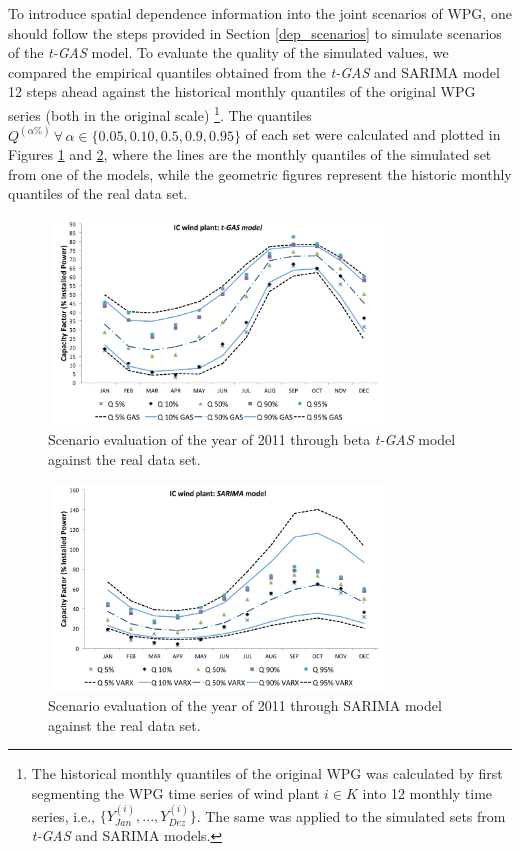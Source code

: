 \documentclass[a4paper]{IEEEtran}
\begin{document}
To introduce spatial dependence information into the joint scenarios of WPG, one should follow the steps provided in Section \ref{dep_scenarios} to simulate scenarios of the \emph{t-GAS} model. To evaluate the quality of the simulated values, we compared the empirical quantiles obtained from the \emph{t-GAS} and SARIMA model 12 steps ahead against the historical monthly quantiles of the original WPG series (both in the original scale) \footnote{The historical monthly quantiles of the original WPG was calculated by first segmenting the WPG time series of wind plant $i \in K$ into 12 monthly time series, i.e., $\{Y_{Jan}^{(i)},..., Y_{Dez}^{(i)}\}$. The same was applied to the simulated sets from \emph{t-GAS} and SARIMA models.}. The quantiles $Q^{(\alpha\%)}\, \forall \,\alpha \in \{0.05, 0.10, 0.5, 0.9, 0.95 \}$ of each set were calculated and plotted in Figures \ref{analise_cenarios_gas} and \ref{analise_cenarios_SARIMA}, where the lines are the monthly quantiles of the simulated set from one of the models, while the geometric figures represent the historic monthly quantiles of the real data set.


\begin{figure}[htbp]
\centering
\includegraphics[height=5.5cm,width=9.0cm]{figures/IC_BETA_GAS.pdf}
\caption{Scenario evaluation of the year of 2011 through beta \emph{t-GAS} model against the real data set.}
\label{analise_cenarios_gas}
\end{figure}


\begin{figure}[htbp]
\centering
\includegraphics[height=5.5cm,width=9.0cm]{figures/IC_COM_LOG.pdf}
\caption{Scenario evaluation of the year of 2011 through SARIMA model against the real data set.}
\label{analise_cenarios_SARIMA}
\end{figure}
\end{document}
